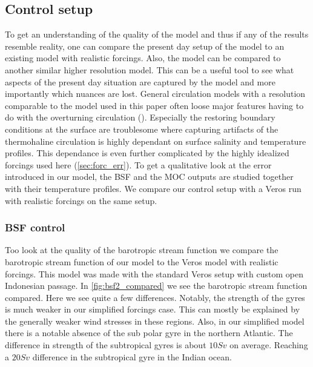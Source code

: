 \subsection{Control setup}

To get an understanding of the quality of the model and thus if any of the results resemble reality, one can compare the present day setup of the model to an existing model with realistic forcings. Also, the model can be compared to another similar higher resolution model. This can be a useful tool to see what aspects of the present day situation are captured by the model and more importantly which nuances are lost. General circulation models with a resolution comparable to the model used in this paper often loose major features having to do with the overturning circulation (\cite{stone1990limitations}). Especially the restoring boundary conditions at the surface are troublesome where capturing artifacts of the thermohaline circulation is highly dependant on surface salinity and temperature profiles. This dependance is even further complicated by the highly idealized forcings used here (\cref{sec:forc_err}). To get a qualitative look at the error introduced in our model, the BSF and the MOC outputs are studied together with their temperature profiles. We compare our control setup with a Veros run with realistic forcings on the same setup.

\subsubsection{BSF control}
Too look at the quality of the barotropic stream function we compare the barotropic stream function of our model to the Veros model with realistic forcings. This model was made with the standard Veros setup with custom open Indonesian passage. In \cref{fig:bsf2_compared} we see the barotropic stream function compared. Here we see quite a few differences. Notably, the strength of the gyres is much weaker in our simplified forcings case. This can mostly be explained by the generally weaker wind stresses in these regions. Also, in our simplified model there is a notable absence of the sub polar gyre in the northern Atlantic. The difference in strength of the subtropical gyres is about $10Sv$ on average. Reaching a $20 Sv$ difference in the subtropical gyre in the Indian ocean. 




